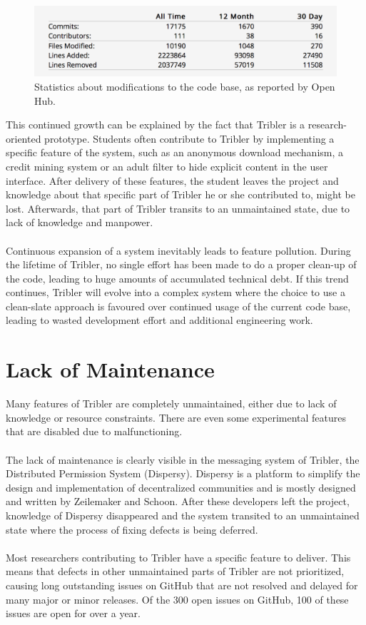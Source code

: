 \begin{figure}[h!]
	\centering
	\includegraphics[width=0.7\columnwidth]{images/openhub_commits_table}
	\caption{Statistics about modifications to the code base, as reported by Open Hub.}
	\label{fig:openhub-commit-stats}
\end{figure}

\noindent This continued growth can be explained by the fact that Tribler is a research-oriented prototype. Students often contribute to Tribler by implementing a specific feature of the system, such as an anonymous download mechanism, a credit mining system or an adult filter to hide explicit content in the user interface. After delivery of these features, the student leaves the project and knowledge about that specific part of Tribler he or she contributed to, might be lost. Afterwards, that part of Tribler transits to an unmaintained state, due to lack of knowledge and manpower.\\\\
Continuous expansion of a system inevitably leads to feature pollution. During the lifetime of Tribler, no single effort has been made to do a proper clean-up of the code, leading to huge amounts of accumulated technical debt. If this trend continues, Tribler will evolve into a complex system where the choice to use a clean-slate approach is favoured over continued usage of the current code base, leading to wasted development effort and additional engineering work.

\section{Lack of Maintenance}
Many features of Tribler are completely unmaintained, either due to lack of knowledge or resource constraints. There are even some experimental features that are disabled due to malfunctioning.\\\\
The lack of maintenance is clearly visible in the messaging system of Tribler, the Distributed Permission System (Dispersy). Dispersy is a platform to simplify the design and implementation of decentralized communities and is mostly designed and written by Zeilemaker and Schoon\cite{zeilemaker2013dispersy}. After these developers left the project, knowledge of Dispersy disappeared and the system transited to an unmaintained state where the process of fixing defects is being deferred.\\\\
Most researchers contributing to Tribler have a specific feature to deliver. This means that defects in other unmaintained parts of Tribler are not prioritized, causing long outstanding issues on GitHub that are not resolved and delayed for many major or minor releases. Of the 300 open issues on GitHub, 100 of these issues are open for over a year.
 
